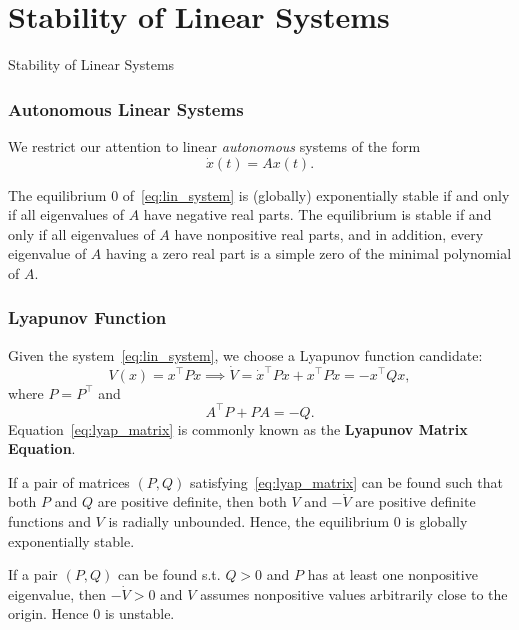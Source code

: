 \section{Stability of Linear Systems}

\begin{frame}
    Stability of Linear Systems


\end{frame}

\begingroup
\small



\begin{frame}
    \frametitle{Autonomous Linear Systems}

    We restrict our attention to linear \textit{autonomous} systems of the form 
    \begin{equation}
        \dot{x}(t) = A x(t).
        \label{eq:lin_system}
    \end{equation}

    \begin{theorem}
        The equilibrium $0$ of~\eqref{eq:lin_system} is (globally) exponentially
        stable if and only if all eigenvalues of $A$ have negative real parts.
        The equilibrium is stable if and only if all eigenvalues of $A$ have
        nonpositive real parts, and in addition, every eigenvalue of $A$ having
        a zero real part is a simple zero of the minimal polynomial of $A$.
    \end{theorem}
\end{frame}

\begin{frame}
    \frametitle{Lyapunov Function}

    Given the system~\eqref{eq:lin_system}, we choose a Lyapunov function
    candidate: \[ V(x) = x^\top P x \implies \dot{V} = \dot{x}^\top P x + x^\top
    P \dot{x} = - x^\top Q x, \] where $P = P^\top$ and 
    \begin{equation}
        A^\top P + PA = -Q.
        \label{eq:lyap_matrix}
    \end{equation}
    Equation~\eqref{eq:lyap_matrix} is commonly known as the \textbf{Lyapunov
    Matrix Equation}.
    \begin{rem}[Stability]
        If a pair of matrices $(P, Q)$ satisfying~\eqref{eq:lyap_matrix} can be
        found such that both $P$ and $Q$ are positive definite, then both $V$
        and $-\dot{V}$ are positive definite functions and $V$ is radially
        unbounded. Hence, the equilibrium $0$ is globally exponentially stable.

        If a pair $(P, Q)$ can be found s.t. $Q > 0$ and $P$ has at least one
        nonpositive eigenvalue, then $-\dot{V} > 0$ and $V$ assumes nonpositive
        values arbitrarily close to the origin. Hence $0$ is unstable.
    \end{rem}
\end{frame}


